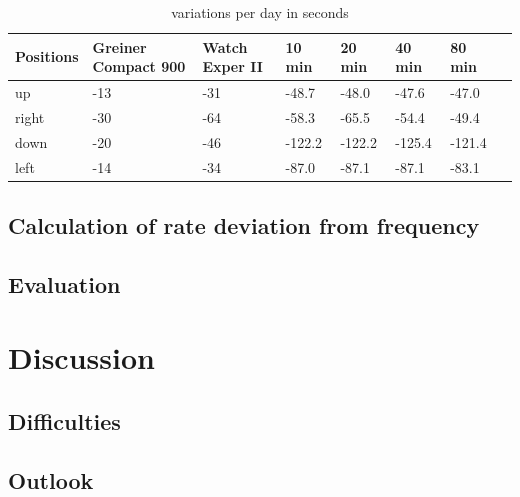 \documentclass[12pt, a4paper]{report}
\begin{document}
    \begin{table}
      \centering
        \begin{tabularx}{\linewidth}{ |L|L|L|L|L|L|L|L|  }
        \hline
        {\fontsize{10}{12}\selectfont \textbf{Positions}} &{\fontsize{9}{10}\selectfont \textbf{Greiner Compact 900}} & {\fontsize{10}{12}\selectfont \textbf{Watch Exper II}} & {\fontsize{10}{12}\selectfont \textbf{10 min}} &  {\fontsize{10}{12}\selectfont \textbf{20 min}} &  {\fontsize{10}{12}\selectfont \textbf{40 min}} & {\fontsize{10}{12}\selectfont  \textbf{80 min}} \\ \hline
        up        & -13                 &      -31  & -48.7     & -48.0     & -47.6      & -47.0      \\ \hline
        right     & -30                 &      -64  & -58.3      & -65.5    & -54.4      & -49.4      \\ \hline
        down      & -20               &  -46  & -122.2    & -122.2     & -125.4    & -121.4      \\ \hline
        left      & -14                & -34 & -87.0	   & -87.1	  & -87.1	  & -83.1      \\ \hline
        \end{tabularx}
          \caption{ variations per day in seconds} 
    \end{table}
    
    \section{Calculation of rate deviation from frequency}
    
    \section{Evaluation}
    
    \chapter{Discussion}
    \section{Difficulties}
    \section{Outlook}
    
    
    
    
    \glsaddall
    \printglossaries

\printbibliography
        
    \listoffigures
    \bigskip
    
    
    
    
\end{document}
